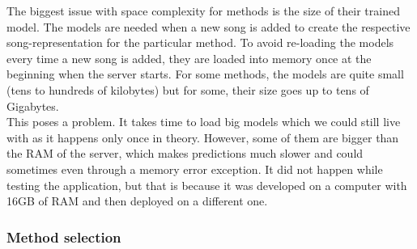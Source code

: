 The biggest issue with space complexity for methods is the size of their trained model. The models are needed when a new song is added to create the respective song-representation for the particular method. To avoid re-loading the models every time a new song is added, they are loaded into memory once at the beginning when the server starts. For some methods, the models are quite small (tens to hundreds of kilobytes) but for some, their size goes up to tens of Gigabytes. \\
This poses a problem. It takes time to load big models which we could still live with as it happens only once in theory. However, some of them are bigger than the RAM of the server, which makes predictions much slower and could sometimes even through a memory error exception. It did not happen while testing the application, but that is because it was developed on a computer with 16GB of RAM and then deployed on a different one.

\subsubsection{Method selection}

